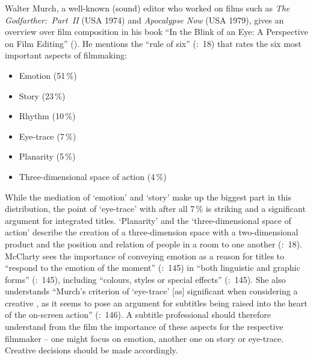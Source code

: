 Walter Murch, a well-known (sound) editor who worked on films such as \textit{The Godfarther:~Part~II} (USA 1974) and \textit{Apocalypse Now} (USA 1979), gives an overview over film composition in his book “In the Blink of an Eye: A Perspective on Film Editing” (\citeyear{murch2001}). He mentions the “rule of six” (\citeyear{murch2001}:~18) that rates the six most important aspects of filmmaking:

\begin{itemize}
\item Emotion (51\,\%)
\item Story (23\,\%)
\item Rhythm (10\,\%)
\item Eye-trace (7\,\%)
\item Planarity (5\,\%)
\item Three-dimensional space of action (4\,\%)
\end{itemize}

While the mediation of ‘emotion’ and ‘story’ make up the biggest part in this distribution, the point of ‘eye-trace’ with after all 7\,\% is striking and a significant argument for integrated titles. ‘Planarity’ and the ‘three-dimensional space of action’ describe the creation of a three-dimension space with a two-dimensional product and the position and relation of people in a room to one another (\citeyear{murch2001}:~18). McClarty sees the importance of conveying emotion as a reason for titles to “respond to the emotion of the moment” (\citeyear{mcclarty2012}:~145) in “both linguistic and graphic forms” (\citeyear{mcclarty2012}:~145), including “colours, styles or special effects” (\citeyear{mcclarty2012}:~145). She also understands “Murch’s criterion of ‘eye-trace’ [as] significant when considering a creative , as it seems to pose an argument for subtitles being raised into the heart of the on-screen action” (\citeyear{mcclarty2012}:~146). A subtitle professional should therefore understand from the film the importance of these aspects for the respective filmmaker – one might focus on emotion, another one on story or eye-trace. Creative decisions should be made accordingly.


